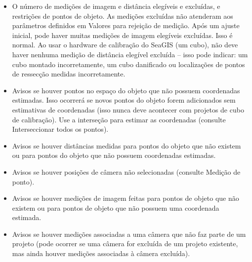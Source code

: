 \documentclass[
  12pt,
  letterpaper,
  DIV=11,
  numbers=noendperiod]{scrreprt}
\providecommand{\tightlist}{%
  \setlength{\itemsep}{0pt}\setlength{\parskip}{0pt}}
\begin{document}
\begin{itemize}
\tightlist
\item
  O número de medições de imagem e distância elegíveis e excluídas, e
  restrições de pontos de objeto. As medições excluídas não atenderam
  aos parâmetros definidos em Valores para rejeição de medição. Após um
  ajuste inicial, pode haver muitas medições de imagem elegíveis
  excluídas. Isso é normal. Ao usar o hardware de calibração do SeaGIS
  (um cubo), não deve haver nenhuma medição de distância elegível
  excluída -- isso pode indicar: um cubo montado incorretamente, um cubo
  danificado ou localizações de pontos de ressecção medidas
  incorretamente.
\end{itemize}

\begin{itemize}
\tightlist
\item
  Avisos se houver pontos no espaço do objeto que não possuem
  coordenadas estimadas. Isso ocorrerá se novos pontos do objeto forem
  adicionados sem estimativas de coordenadas (isso nunca deve acontecer
  com projetos de cubo de calibração). Use a interseção para estimar as
  coordenadas (consulte Interseccionar todos os pontos).
\end{itemize}

\begin{itemize}
\tightlist
\item
  Avisos se houver distâncias medidas para pontos do objeto que não
  existem ou para pontos do objeto que não possuem coordenadas
  estimadas.
\end{itemize}

\begin{itemize}
\tightlist
\item
  Avisos se houver posições de câmera não selecionadas (consulte Medição
  de ponto).
\end{itemize}

\begin{itemize}
\tightlist
\item
  Avisos se houver medições de imagem feitas para pontos de objeto que
  não existem ou para pontos de objeto que não possuem uma coordenada
  estimada.
\end{itemize}

\begin{itemize}
\tightlist
\item
  Avisos se houver medições associadas a uma câmera que não faz parte de
  um projeto (pode ocorrer se uma câmera for excluída de um projeto
  existente, mas ainda houver medições associadas à câmera excluída).
\end{itemize}
\end{document}

